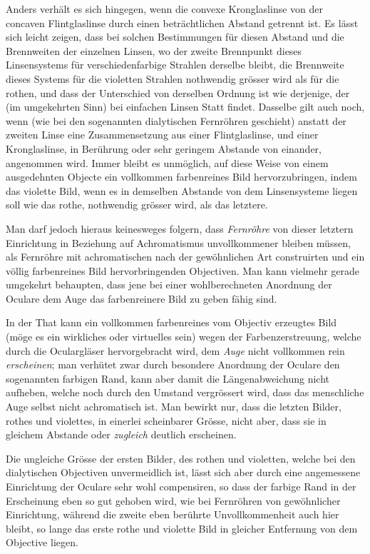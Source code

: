 Anders verhält es sich hingegen, wenn die convexe Kronglaslinse von der concaven Flintglaslinse durch einen beträchtlichen Abstand getrennt ist. Es lässt sich leicht zeigen, dass bei solchen Bestimmungen für diesen Abstand und die Brennweiten der einzelnen Linsen, wo der zweite Brennpunkt dieses Linsensystems für verschiedenfarbige Strahlen derselbe bleibt, die Brennweite dieses Systems für die violetten Strahlen nothwendig grösser wird als für die rothen, und dass der Unterschied von derselben Ordnung ist wie derjenige, der (im umgekehrten Sinn) bei einfachen Linsen Statt findet. Dasselbe gilt auch noch, wenn (wie bei den sogenannten dialytischen Fernröhren geschieht) anstatt der zweiten Linse
eine Zusammensetzung aus einer Flintglaslinse, und einer Kronglaslinse, in Berührung oder sehr geringem Abstande von einander, angenommen wird. Immer bleibt es unmöglich, auf diese Weise von einem ausgedehnten Objecte ein vollkommen farbenreines Bild hervorzubringen, indem das violette Bild, wenn es in demselben Abstande von dem Linsensysteme liegen soll wie das rothe, nothwendig grösser wird, als das letztere.

Man darf jedoch hieraus keinesweges folgern, dass \textit{Fernröhre} von dieser letztern Einrichtung in Beziehung auf Achromatismus unvollkommener bleiben müssen, als Fernröhre mit achromatischen nach der gewöhnlichen Art construirten und ein völlig farbenreines Bild hervorbringenden Objectiven. Man kann vielmehr gerade umgekehrt behaupten, dass jene bei einer wohlberechneten Anordnung der Oculare dem Auge das farbenreinere Bild zu geben fähig sind.

In der That kann ein vollkommen farbenreines vom Objectiv erzeugtes Bild (möge es ein wirkliches oder virtuelles sein) wegen der Farbenzerstreuung, welche durch die Oculargläser hervorgebracht wird, dem \textit{Auge} nicht vollkommen rein \textit{erscheinen}; man verhütet zwar durch besondere Anordnung der Oculare den sogenannten farbigen Rand, kann aber damit die Längenabweichung nicht aufheben, welche noch durch den Umstand vergrössert wird, dass das menschliche Auge selbst nicht achromatisch ist. Man bewirkt nur, dass die letzten Bilder, rothes und violettes, in einerlei scheinbarer Grösse, nicht aber, dass sie in gleichem Abstande oder \textit{zugleich} deutlich erscheinen.

Die ungleiche Grösse der ersten Bilder, des rothen und violetten, welche bei den dialytischen Objectiven unvermeidlich ist, lässt sich aber durch eine angemessene Einrichtung der Oculare sehr wohl compensiren, so dass der farbige Rand in der Erscheinung eben so gut gehoben wird, wie bei Fernröhren von gewöhnlicher Einrichtung, während die zweite eben berührte Unvollkommenheit auch hier bleibt, so lange das erste rothe und violette Bild in gleicher Entfernung von dem Objective liegen.

